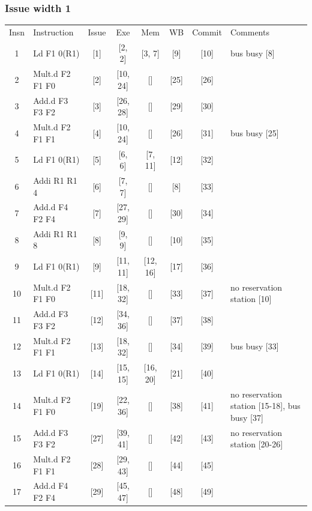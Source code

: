 \documentclass[11pt]{article}
\begin{document}
\subsubsection*{Issue width 1}
\begin{center}
\scriptsize
\setlength{\tabcolsep}{8pt}
\renewcommand{\arraystretch}{1.35}
\begin{tabular}{clccccc>{\raggedright\arraybackslash}p{1.4in}}
Insn & Instruction & Issue & Exe & Mem & WB & Commit & Comments \\
1 & Ld F1 0(R1) & [1] & [2, 2] & [3, 7] & [9] & [10] & bus busy [8] \\
2 & Mult.d F2 F1 F0 & [2] & [10, 24] & [] & [25] & [26] &  \\
3 & Add.d F3 F3 F2 & [3] & [26, 28] & [] & [29] & [30] &  \\
4 & Mult.d F2 F1 F1 & [4] & [10, 24] & [] & [26] & [31] & bus busy [25] \\
5 & Ld F1 0(R1) & [5] & [6, 6] & [7, 11] & [12] & [32] &  \\
6 & Addi R1 R1 4 & [6] & [7, 7] & [] & [8] & [33] &  \\
7 & Add.d F4 F2 F4 & [7] & [27, 29] & [] & [30] & [34] &  \\
8 & Addi R1 R1 8 & [8] & [9, 9] & [] & [10] & [35] &  \\
9 & Ld F1 0(R1) & [9] & [11, 11] & [12, 16] & [17] & [36] &  \\
10 & Mult.d F2 F1 F0 & [11] & [18, 32] & [] & [33] & [37] & no reservation station [10] \\
11 & Add.d F3 F3 F2 & [12] & [34, 36] & [] & [37] & [38] &  \\
12 & Mult.d F2 F1 F1 & [13] & [18, 32] & [] & [34] & [39] & bus busy [33] \\
13 & Ld F1 0(R1) & [14] & [15, 15] & [16, 20] & [21] & [40] &  \\
14 & Mult.d F2 F1 F0 & [19] & [22, 36] & [] & [38] & [41] & no reservation station [15-18], bus busy [37] \\
15 & Add.d F3 F3 F2 & [27] & [39, 41] & [] & [42] & [43] & no reservation station [20-26] \\
16 & Mult.d F2 F1 F1 & [28] & [29, 43] & [] & [44] & [45] &  \\
17 & Add.d F4 F2 F4 & [29] & [45, 47] & [] & [48] & [49] &  \\
\end{tabular}
\end{center}
\end{document}
